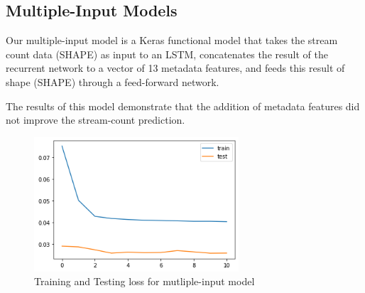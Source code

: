 \documentclass[11pt]{article}
\begin{document}
\subsection{Multiple-Input Models}

Our multiple-input model is a Keras functional model that takes the stream count data (SHAPE) as input to an LSTM, concatenates the result of the recurrent network to a vector of 13 metadata features, and feeds this result of shape (SHAPE) through a feed-forward network. 

The results of this model demonstrate that the addition of metadata features did not improve the stream-count prediction. 


\begin{figure}[h]
    \centering 
    \includegraphics[width=3in]{figs/loss}
    \caption{Training and Testing loss for mutliple-input model }
\end{figure}


% 
% 


\end{document}

